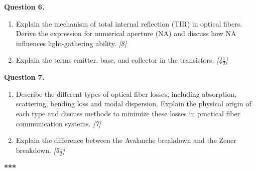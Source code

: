 \documentclass[11pt,a4paper]{article}
\newcommand{\pts}[1]{\hfill \textit{[#1]}}
\begin{document}
\bigskip

\noindent \textbf{Question 6.}
\begin{enumerate}[label=(\alph*)]
  \item Explain the mechanism of total internal reflection (TIR) in optical fibers. Derive the expression for numerical aperture (NA) and discuss how NA influences light-gathering ability. \pts{8}
  \item Explain the terms emitter, base, and collector in the transistors. \pts{4$\frac{1}{2}$}
\end{enumerate}

\bigskip

\noindent \textbf{Question 7.}
\begin{enumerate}[label=(\alph*)]
  \item Describe the different types of optical fiber losses, including absorption, scattering, bending loss and modal dispersion. Explain the physical origin of each type and discuss methods to minimize these losses in practical fiber communication systems. \pts{7}
  \item Explain the difference between the Avalanche breakdown and the Zener breakdown. \pts{5$\frac{1}{2}$}
\end{enumerate}

\bigskip
\begin{center}
  \textbf{***}
\end{center}
\end{document}
